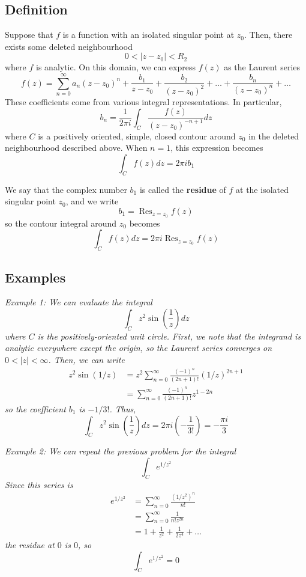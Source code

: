 \documentclass{article}
\renewcommand{\emph}{\textbf}
\DeclareMathOperator{\Res}{Res}
\begin{document}
\subsection{Definition}
Suppose that $f$ is a function with an isolated singular point at $z_0$. Then, there exists some deleted neighbourhood
\[
	0 < |z - z_0| < R_2
\]
where $f$ is analytic. On this domain, we can express $f(z)$ as the Laurent series
\[
	f(z) = \sum_{n=0}^\infty a_n (z - z_0)^n
	+ \frac{b_1}{z - z_0}
	+ \frac{b_2}{(z - z_0)^2}
	+ \dots
	+ \frac{b_n}{(z - z_0)^n}
	+ \dots
\]
These coefficients come from various integral representations. In particular,
\[
	b_n = \frac{1}{2\pi i} \int_C \frac{f(z)}{(z - z_0)^{-n+1}} dz
\]
where $C$ is a positively oriented, simple, closed contour around $z_0$ in the deleted neighbourhood described above. When $n = 1$, this expression becomes
\[
	\int_C f(z) dz = 2\pi i b_1
\]

We say that the complex number $b_1$ is called the \emph{residue} of $f$ at the isolated singular point $z_0$, and we write
\[
	b_1 = \Res_{z = z_0} f(z)
\]
so the contour integral around $z_0$ becomes
\[
	\int_C f(z) dz = 2\pi i \Res_{z = z_0} f(z)
\]

\subsection{Examples}
\textit{Example 1: We can evaluate the integral
\[
	\int_C z^2 \sin\left( \frac{1}{z} \right) dz
\]
where $C$ is the positively-oriented unit circle. First, we note that the integrand is analytic everywhere except the origin, so the Laurent series converges on $0 < |z| < \infty$. Then, we can write
\begin{align*}
	z^2 \sin(1 / z)
	&= z^2 \sum_{n=0}^\infty \frac{(-1)^n}{(2n+1)!} (1 / z)^{2n+1} \\
	&= \sum_{n=0}^\infty \frac{(-1)^n}{(2n+1)!} z^{1 - 2n}
\end{align*}
so the coefficient $b_1$ is $-1/3!$. Thus,
\[
	\int_C z^2 \sin\left( \frac{1}{z} \right) dz
	= 2\pi i \left( -\frac{1}{3!} \right) 
	= -\frac{\pi i}{3}
\]}

\textit{Example 2: We can repeat the previous problem for the integral
\[
	\int_C e^{1 / z^2}
\]
Since this series is
\begin{align*}
	e^{1 / z^2}
	&= \sum_{n=0}^\infty \frac{(1 / z^2)^n}{n!} \\
	&= \sum_{n=0}^\infty \frac{1}{n! z^{2n}} \\
	&= 1 + \frac{1}{z^2} + \frac{1}{2 z^4} + \dots 
\end{align*}
the residue at $0$ is $0$, so
\[
	\int_C e^{1 / z^2} = 0
\]}
\end{document}
